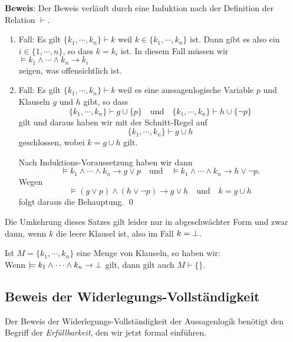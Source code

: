 \noindent
\textbf{Beweis}:  Der Beweis verl\"{a}uft durch eine Induktion nach der Definition der Relation $\vdash$. 
\begin{enumerate}
\item Fall: Es gilt $\{ k_1, \cdots, k_n \} \vdash k$ weil $k \in \{ k_1, \cdots, k_n \}$ ist.  
      Dann gibt es also ein $i \in \{1,\cdots,n\}$, so dass $k = k_i$ ist.  In diesem Fall
      m\"{u}ssen wir
      \\[0.2cm]
      \hspace*{1.3cm}
      $\models k_1 \wedge \cdots \wedge k_n \rightarrow k_i$
      \\[0.2cm]
      zeigen, was offensichtlich ist.
\item Fall: Es gilt $\{ k_1, \cdots, k_n \} \vdash k$ weil es eine aussagenlogische
      Variable $p$ und Klauseln $g$ und $h$ gibt, so dass 
      \[ \{ k_1, \cdots, k_n \} \vdash g \cup \{ p \} \quad \mathrm{und} \quad
         \{ k_1, \cdots, k_n \} \vdash h \cup \{ \neg p \}
      \]
      gilt und daraus haben wir mit der Schnitt-Regel auf
      \[ \{ k_1, \cdots, k_n \} \vdash g \cup h \]
      geschlossen, wobei $k = g \cup h$ gilt. 

      Nach Induktions-Voraussetzung haben wir dann
      \[ \models k_1 \wedge \cdots \wedge k_n \rightarrow g \vee p \quad \mathrm{und} \quad 
         \models k_1 \wedge \cdots \wedge k_n \rightarrow h \vee \neg p. \]
      Wegen 
      \[ \models (g \vee p) \wedge (h \vee \neg p) \rightarrow g \vee h \quad \mathrm{und} \quad
         k = g \cup h \]
      folgt daraus die Behauptung.
      \qed
\end{enumerate}

\noindent
Die Umkehrung dieses Satzes gilt leider nur in abgeschw\"{a}chter Form und zwar dann, wenn $k$
die leere Klausel ist, also im Fall $k = \bot$.
\begin{Satz} \label{widerlegungs-vollstaendig}
  Ist  $M = \{k_1, \cdots, k_n \}$ eine Menge von Klauseln,
  so haben wir: \\[0.1cm]
  \hspace*{1.3cm} 
  Wenn $\models k_1 \wedge \cdots \wedge k_n \rightarrow \bot$ gilt, dann gilt auch  $M \vdash \{\}$.
\end{Satz}
\vspace*{0.2cm}



\subsection{Beweis der Widerlegungs-Vollst\"{a}ndigkeit}
Der Beweis der Widerlegungs-Vollst\"{a}ndigkeit der Aussagenlogik ben\"{o}tigt den  Begriff der
\emph{Erf\"{u}llbarkeit}, den wir jetzt formal einf\"{u}hren. 

